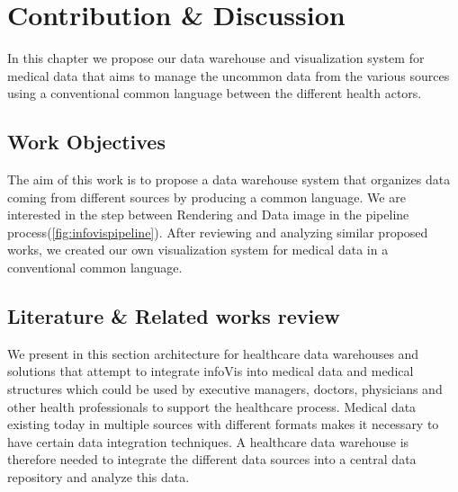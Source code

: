 \chapter{Contribution \& Discussion}
In this chapter we propose our data warehouse and visualization system for medical data that aims to manage the uncommon data from the various sources using a conventional common language between the different health actors.




\section{Work Objectives}
The aim of this work is to propose a data warehouse system that organizes data coming from different sources by producing a common language. We are interested in the step between Rendering and Data image in the pipeline process(\ref{fig:infovispipeline}). After reviewing and analyzing similar proposed works, we created our own visualization system for medical data in a conventional common language.





\section{Literature \& Related works review}
We present in this section architecture for healthcare data warehouses and solutions that attempt to integrate infoVis into medical data and medical structures which could be used by executive managers, doctors, physicians and other health professionals to support the healthcare process.  Medical data existing today in multiple sources with different formats makes it necessary to have certain data integration techniques. A healthcare data warehouse is therefore needed to integrate the different data sources into a central data repository and analyze this data.

